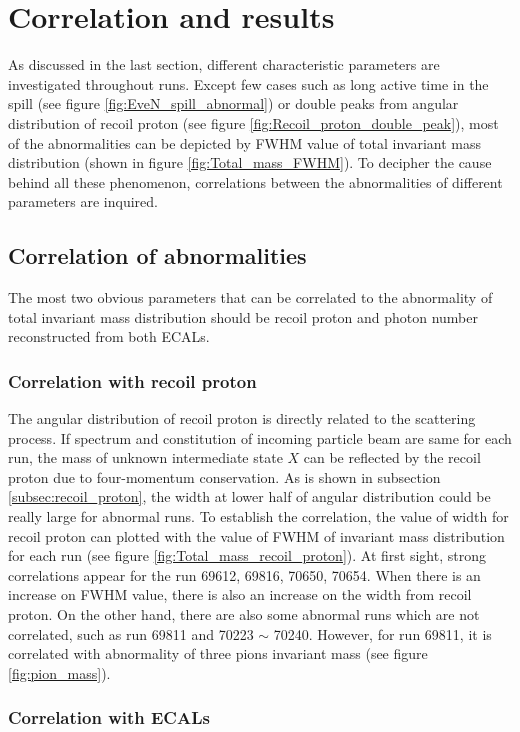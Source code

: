 
\section{Correlation and results}
As discussed in the last section, different characteristic parameters are investigated throughout runs. Except few cases such as long active time in the spill (see figure \ref{fig:EveN_spill_abnormal}) or double peaks from angular distribution of recoil proton (see figure \ref{fig:Recoil_proton_double_peak}), most of the abnormalities can be depicted by FWHM value of total invariant mass distribution (shown in figure \ref{fig:Total_mass_FWHM}). To decipher the cause behind all these phenomenon, correlations between the abnormalities of different parameters are inquired.

\subsection{Correlation of abnormalities}
The most two obvious parameters that can be correlated to the abnormality of total invariant mass distribution should be recoil proton and photon number reconstructed from both ECALs.
\subsubsection{Correlation with recoil proton}
The angular distribution of recoil proton is directly related to the scattering process. If spectrum and constitution of incoming particle beam are same for each run, the mass of unknown intermediate state $X$ can be reflected by the recoil proton due to four-momentum conservation. As is shown in subsection \ref{subsec:recoil_proton}, the width at lower half of angular distribution could be really large for abnormal runs. To establish the correlation, the value of width for recoil proton can plotted with the value of FWHM of invariant mass distribution for each run (see figure \ref{fig:Total_mass_recoil_proton}). At first sight, strong correlations appear for the run 69612, 69816, 70650, 70654. When there is an increase on FWHM value, there is also an increase on the width from recoil proton. On the other hand, there are also some abnormal runs which are not correlated, such as run 69811 and 70223 $\sim$ 70240. However, for run 69811, it is correlated with abnormality of three pions invariant mass (see figure \ref{fig:pion_mass}).


\subsubsection{Correlation with ECALs}

